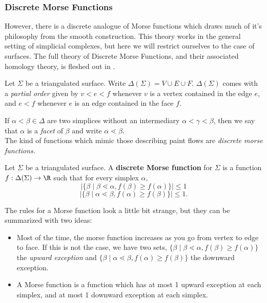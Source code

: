 \subsubsection{Discrete Morse Functions}
However, there is a discrete analogue of Morse functions which draws much of it's philosophy from the smooth construction.\label{proj:morsetheory} \project This theory works in the general setting of simplicial complexes, but here we will restrict ourselves to the case of surfaces. The full theory of Discrete Morse Functions, and their associated homology theory, is fleshed out in \cite{forman2002user}. 
\begin{definition}
Let $\Sigma$ be a triangulated surface. Write $\Delta(\Sigma)= V\cup E\cup F$. $\Delta(\Sigma)$ comes with a \emph{partial order} given by $v<e<f$ whenever $v$ is a vertex contained in the edge $e$, and $e<f$ whenever $e$ is an edge contained in the face $f$. \\
\end{definition}
If $\alpha< \beta \in \Delta$ are two simplices without an intermediary $\alpha<\gamma<\beta$, then we say that $\alpha$ is a \emph{facet} of $\beta$ and write $\alpha\lessdot\beta$. \\
The kind of functions which mimic those describing paint flows are \emph{discrete morse functions. } 
\begin{definition}
Let $\Sigma$ be a triangulated surface. A \textbf{discrete Morse function} for $\Sigma$ is a function $f: \Delta(\Sigma)\to \R$ such that for every simplex $\alpha$,
\[|\{\beta \;|\; \beta\lessdot \alpha ,  f(\beta)\geq f(\alpha)\}|\leq 1\]
\[|\{\beta \;|\; \alpha\lessdot \beta ,  f(\alpha)\geq f(\beta)\}|\leq 1.\]
\end{definition}
The rules for a Morse function look a little bit strange, but they can be summarized with two ideas:
\begin{itemize}
\item  Most of the time, the morse function increases as you go from vertex to edge to face. If this is not the case, we have two sets,  $\{\beta \;|\; \beta\lessdot \alpha ,  f(\beta)\geq f(\alpha)\}$ the \emph{upward exception} and $\{\beta \;|\; \alpha\lessdot \beta ,  f(\alpha)\geq f(\beta)\}$ the downward exception. 
\item A Morse function is a function which has at most 1 upward exception at each simplex, and at most 1 downward exception at each simplex. 
\end{itemize}

